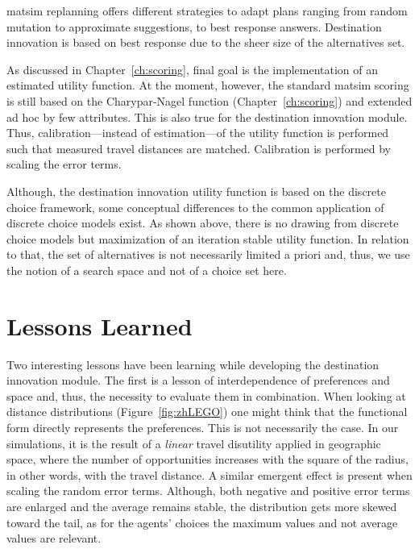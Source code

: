 \gls{matsim} replanning offers different strategies to adapt plans ranging from random mutation to approximate suggestions, to best response answers. 
Destination innovation is based on best response due to the sheer size of the alternatives set. 

As discussed in Chapter~\ref{ch:scoring}, final goal is the implementation of an estimated utility function. 
At the moment, however, the standard \gls{matsim} scoring is still based on the Charypar-Nagel function (Chapter~\ref{ch:scoring}) and extended ad hoc by few attributes. 
This is also true for the destination innovation module. 
Thus, calibration---instead of estimation---of the utility function is performed such that measured travel distances are matched. 
Calibration is performed by scaling the error terms. 

Although, the destination innovation utility function is based on the discrete choice framework, some conceptual differences to the common application of discrete choice models exist. 
As shown above, there is no drawing from discrete choice models but maximization of an iteration stable utility function. 
In relation to that, the set of alternatives is not necessarily limited a priori and, thus, we use the notion of a search space and not of a choice set here.

\section{Lessons Learned}
Two interesting lessons have been learning while developing the destination innovation module. 
The first is a lesson of interdependence of preferences and space and,  thus, the necessity to evaluate them in combination. 
When looking at distance distributions (\eg Figure~\ref{fig:zhLEGO}) one might think that the functional form directly represents the preferences. 
This is not necessarily the case. 
In our simulations, it is the result of a \emph{linear} travel disutility applied in geographic space, where the number of opportunities increases with the square of the radius, in other words, with the travel distance. 
A similar emergent effect is present when scaling the random error terms. 
Although, both negative and positive error terms are enlarged and the average remains stable, the distribution gets more skewed toward the tail, as for the agents' choices the maximum values and not average values are relevant.

